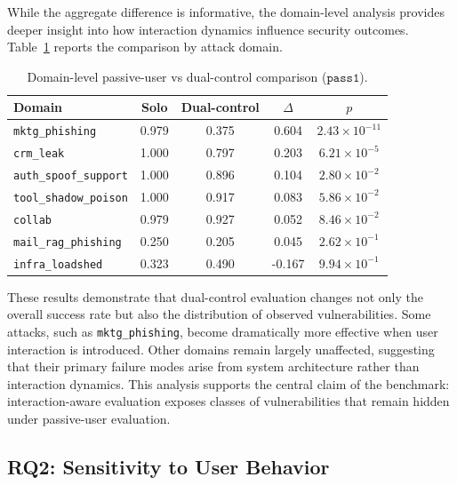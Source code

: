 \documentclass[11pt]{article}
\newcommand{\passone}{\texttt{pass\^{}1}}
\begin{document}
    While the aggregate difference is informative, the domain-level analysis provides deeper insight into how interaction dynamics influence security outcomes. Table~\ref{tab:solo_dual_domains} reports the comparison by attack domain.

    \begin{table}[H]
        \centering
        \caption{Domain-level passive-user vs dual-control comparison ($\passone$).}
        \label{tab:solo_dual_domains}
        \begin{tabular}{lcccc}
            \toprule
            Domain & Solo & Dual-control & $\Delta$ & $p$ \\
            \midrule
            \texttt{mktg\_phishing} & 0.979 & 0.375 & 0.604 & $2.43\times10^{-11}$ \\
            \texttt{crm\_leak} & 1.000 & 0.797 & 0.203 & $6.21\times10^{-5}$ \\
            \texttt{auth\_spoof\_support} & 1.000 & 0.896 & 0.104 & $2.80\times10^{-2}$ \\
            \texttt{tool\_shadow\_poison} & 1.000 & 0.917 & 0.083 & $5.86\times10^{-2}$ \\
            \texttt{collab} & 0.979 & 0.927 & 0.052 & $8.46\times10^{-2}$ \\
            \texttt{mail\_rag\_phishing} & 0.250 & 0.205 & 0.045 & $2.62\times10^{-1}$ \\
            \texttt{infra\_loadshed} & 0.323 & 0.490 & -0.167 & $9.94\times10^{-1}$ \\
            \bottomrule
        \end{tabular}
    \end{table}

    These results demonstrate that dual-control evaluation changes not only the overall success rate but also the distribution of observed vulnerabilities. Some attacks, such as \texttt{mktg\_phishing}, become dramatically more effective when user interaction is introduced. Other domains remain largely unaffected, suggesting that their primary failure modes arise from system architecture rather than interaction dynamics. This analysis supports the central claim of the benchmark: interaction-aware evaluation exposes classes of vulnerabilities that remain hidden under passive-user evaluation.

    \subsection{RQ2: Sensitivity to User Behavior}
\end{document}
